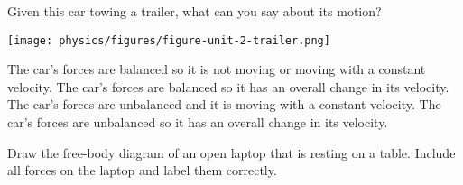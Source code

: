 \documentclass[answers]{exam}
\newif\ifversionKlevel
\begin{document}
\begin{questions}
\question
Given this car towing a trailer, what can you say about its motion?

\begin{center}
    \texttt{[image: physics/figures/figure-unit-2-trailer.png]}
\end{center}

\begin{randomizechoices}[norandomize]
    \choice The car’s forces are balanced so it is not moving or moving with a constant velocity.
    \choice The car’s forces are balanced so it has an overall change in its velocity.
    \choice The car’s forces are unbalanced and it is moving with a constant velocity.
    \correctchoice The car’s forces are unbalanced so it has an overall change in its velocity.    
\end{randomizechoices}


\ifversionKlevel
\begin{EnvUplevel}
    \textbf{Questions \ref{71tbo}--\ref{3M4Xb}.} The free-body diagram below represents an object moving to the right.
\end{EnvUplevel}


\begin{center}
    \begin{tikzpicture}
        \fill (0,0) circle (5pt);
        \draw[ultra thick,<->] (0,-1) -- (0,1);
        \draw[ultra thick,<->] (-2,0) -- (1,0);
    \end{tikzpicture}
\end{center}

\question \label{71tbo}
The object is\dots .

\begin{randomizechoices}[norandomize,keeplast]
    \choice speeding up
    \correctchoice slowing down
    \choice moving at constant speed 
    \choice none of the above
\end{randomizechoices}

\question \label{3M4Xb}
Are the force on the object balanced or unbalanced?

\begin{randomizeoneparchoices}[norandomize]
    \choice balanced
    \correctchoice unbalanced
\end{randomizeoneparchoices}

\fi

\clearpage

\ifprintanswers
    \printkeytable
\fi

\clearpage

\question[3]
Draw the free-body diagram of an open laptop that is resting on a table. Include all forces on the laptop and label them correctly. 


\end{questions}
\end{document}

